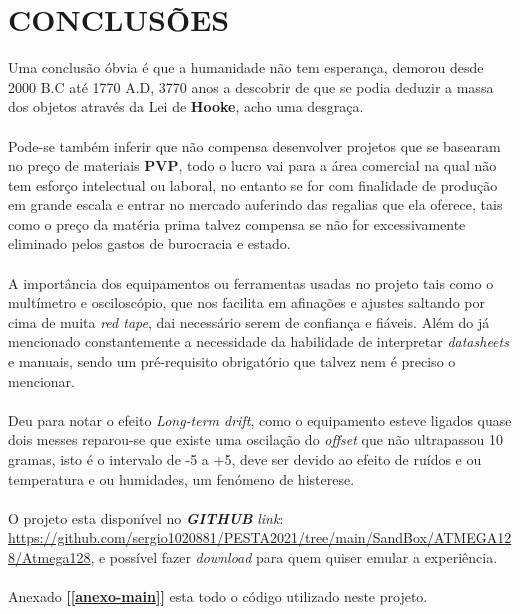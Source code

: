 \chapter{CONCLUSÕES}
Uma conclusão óbvia é que a humanidade não tem esperança, demorou desde 2000 B.C até 1770 A.D, 3770 anos a descobrir de que se podia deduzir a massa dos objetos através da Lei de \textbf{Hooke}, acho uma desgraça.
\\
\\
Pode-se também inferir que não compensa desenvolver projetos que se basearam no preço de materiais \textbf{PVP}, todo o lucro vai para a área comercial na qual não tem esforço intelectual ou laboral, no entanto se for com finalidade de produção em grande escala e entrar no mercado auferindo das regalias que ela oferece, tais como o preço da matéria prima talvez compensa se não for excessivamente eliminado pelos gastos de burocracia e estado.
\\
\\
A importância dos equipamentos ou ferramentas usadas no projeto tais como o multímetro e osciloscópio, que nos facilita em afinações e ajustes saltando por cima de muita \textit{red tape}, dai necessário serem de confiança e fiáveis. Além do já mencionado constantemente a necessidade da habilidade de interpretar \textit{datasheets} e manuais, sendo um pré-requisito obrigatório que talvez nem é preciso o mencionar.
\\
\\
Deu para notar o efeito \textit{Long-term drift}, como o equipamento esteve ligados quase dois messes reparou-se que existe uma oscilação do \textit{offset} que não ultrapassou 10 gramas, isto é o intervalo de -5 a +5, deve ser devido ao efeito de ruídos e ou temperatura e ou humidades, um fenómeno de histerese.
\\
\\
O projeto esta disponível no \textit{\textbf{GITHUB}} \textit{link}: \url{https://github.com/sergio1020881/PESTA2021/tree/main/SandBox/ATMEGA128/Atmega128}, e possível fazer \textit{download} para quem quiser emular a experiência.
\\
\\
Anexado \textbf{[\ref{anexo-main}]} esta todo o código utilizado neste projeto.
\begin{comment}
Sensitivity,Long-Term Drift e Temperature Effects (Span temperature hysteresis).
\end{comment}
